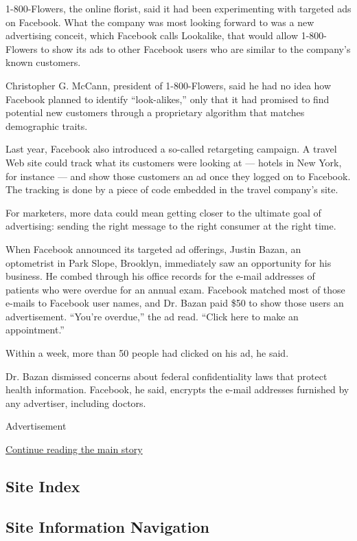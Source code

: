 1-800-Flowers, the online florist, said it had been experimenting with
targeted ads on Facebook. What the company was most looking forward to
was a new advertising conceit, which Facebook calls Lookalike, that
would allow 1-800-Flowers to show its ads to other Facebook users who
are similar to the company's known customers.

Christopher G. McCann, president of 1-800-Flowers, said he had no idea
how Facebook planned to identify ``look-alikes,'' only that it had
promised to find potential new customers through a proprietary algorithm
that matches demographic traits.

Last year, Facebook also introduced a so-called retargeting campaign. A
travel Web site could track what its customers were looking at ---
hotels in New York, for instance --- and show those customers an ad once
they logged on to Facebook. The tracking is done by a piece of code
embedded in the travel company's site.

For marketers, more data could mean getting closer to the ultimate goal
of advertising: sending the right message to the right consumer at the
right time.

When Facebook announced its targeted ad offerings, Justin Bazan, an
optometrist in Park Slope, Brooklyn, immediately saw an opportunity for
his business. He combed through his office records for the e-mail
addresses of patients who were overdue for an annual exam. Facebook
matched most of those e-mails to Facebook user names, and Dr. Bazan paid
\$50 to show those users an advertisement. ``You're overdue,'' the ad
read. ``Click here to make an appointment.''

Within a week, more than 50 people had clicked on his ad, he said.

Dr. Bazan dismissed concerns about federal confidentiality laws that
protect health information. Facebook, he said, encrypts the e-mail
addresses furnished by any advertiser, including doctors.

Advertisement

\protect\hyperlink{after-bottom}{Continue reading the main story}

\hypertarget{site-index}{%
\subsection{Site Index}\label{site-index}}

\hypertarget{site-information-navigation}{%
\subsection{Site Information
Navigation}\label{site-information-navigation}}

